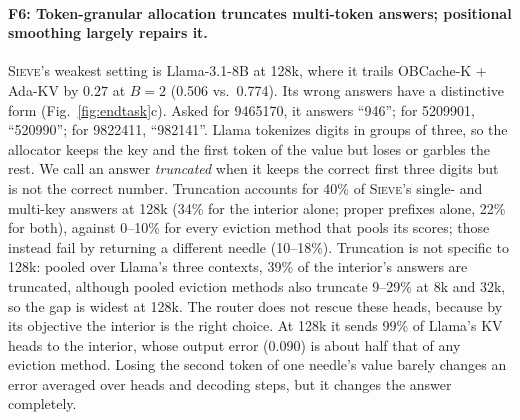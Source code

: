 \documentclass{article}
\newcommand{\sieve}{\textsc{Sieve}}
\theoremstyle{definition}
\begin{document}
\paragraph{F6: Token-granular allocation truncates multi-token answers; positional smoothing largely repairs it.}
\sieve{}'s weakest setting is Llama-3.1-8B at 128k, where it trails OBCache-K + Ada-KV by $0.27$ at $B=2$ (0.506 vs.\ 0.774).  Its wrong answers have a distinctive form (Fig.~\ref{fig:endtask}c).  Asked for 9465170, it answers ``946''; for 5209901, ``520990''; for 9822411, ``982141''.  Llama tokenizes digits in groups of three, so the allocator keeps the key and the first token of the value but loses or garbles the rest.  We call an answer \emph{truncated} when it keeps the correct first three digits but is not the correct number.  Truncation accounts for 40\% of \sieve{}'s single- and multi-key answers at 128k (34\% for the interior alone; proper prefixes alone, 22\% for both), against 0--10\% for every eviction method that pools its scores; those instead fail by returning a different needle (10--18\%).  Truncation is not specific to 128k: pooled over Llama's three contexts, 39\% of the interior's answers are truncated, although pooled eviction methods also truncate 9--29\% at 8k and 32k, so the gap is widest at 128k.  The router does not rescue these heads, because by its objective the interior is the right choice.  At 128k it sends 99\% of Llama's KV heads to the interior, whose output error (0.090) is about half that of any eviction method.  Losing the second token of one needle's value barely changes an error averaged over heads and decoding steps, but it changes the answer completely.
\end{document}
